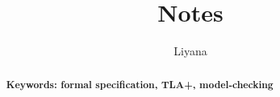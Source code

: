 \documentclass{article}
\begin{document}
\title{Notes}
\author{Liyana}
\maketitle

\renewcommand{\abstractname}{\underline{Executive summary}}
\begin{abstract}
\textbf{Keywords: formal specification, TLA+, model-checking}
\end{abstract}

\tableofcontents
\end{document}
